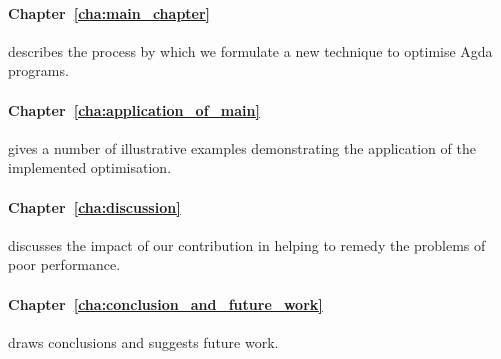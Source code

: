 
\paragraph{Chapter~\ref{cha:main_chapter}} describes the process by which we formulate a new technique to optimise Agda programs.

\paragraph{Chapter~\ref{cha:application_of_main}} gives a number of illustrative examples demonstrating the application of the implemented optimisation.


\paragraph{Chapter~\ref{cha:discussion}} discusses the impact of our contribution in helping to remedy the problems of poor performance.

\paragraph{Chapter~\ref{cha:conclusion_and_future_work}} draws conclusions and suggests future work.

